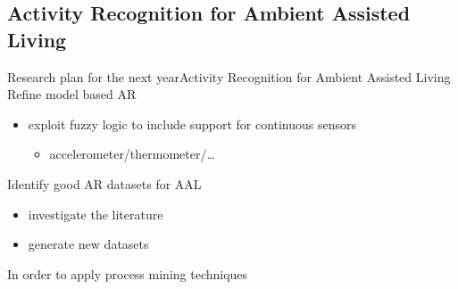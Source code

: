   \subsection{Activity Recognition for Ambient Assisted Living}
    \begin{frame}{Research plan for the next year}{Activity Recognition for Ambient Assisted Living}
      Refine model based AR
      \begin{itemize}
        \item exploit fuzzy logic to include support for continuous sensors
        \begin{itemize}
          \item accelerometer/thermometer/\dots
        \end{itemize}
      \end{itemize}
      
      \vspace{1.5em}
      Identify good AR datasets for AAL
      \begin{itemize}
        \item investigate the literature
        \item generate new datasets
      \end{itemize}
      In order to apply process mining techniques
    \end{frame}
